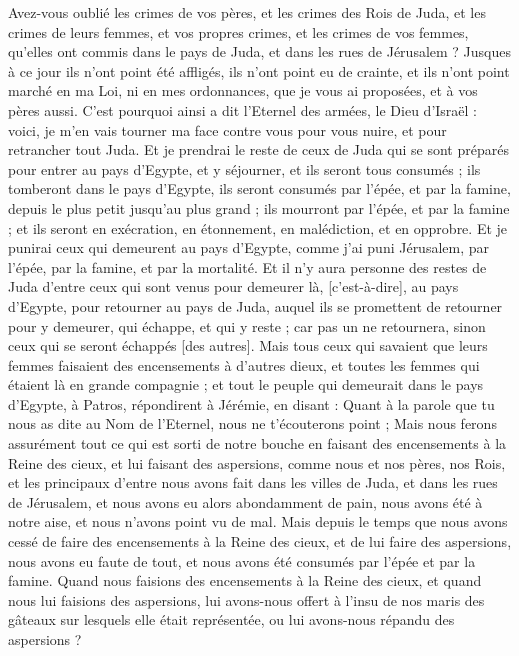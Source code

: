\begin{multicols}{2}
Avez-vous oublié les crimes de vos pères, et les crimes des Rois de Juda, et les crimes de leurs femmes, et vos propres crimes, et les crimes de vos femmes, qu'elles ont commis dans le pays de Juda, et dans les rues de Jérusalem ?
Jusques à ce jour ils n'ont point été affligés, ils n'ont point eu de crainte, et ils n'ont point marché en ma Loi, ni en mes ordonnances, que je vous ai proposées, et à vos pères aussi.
C'est pourquoi ainsi a dit l'Eternel des armées, le Dieu d'Israël : voici, je m'en vais tourner ma face contre vous pour vous nuire, et pour retrancher tout Juda.
Et je prendrai le reste de ceux de Juda qui se sont préparés pour entrer au pays d'Egypte, et y séjourner, et ils seront tous consumés ; ils tomberont dans le pays d'Egypte, ils seront consumés par l'épée, et par la famine, depuis le plus petit jusqu’au plus grand ; ils mourront par l'épée, et par la famine ; et ils seront en exécration, en étonnement, en malédiction, et en opprobre.
Et je punirai ceux qui demeurent au pays d'Egypte, comme j'ai puni Jérusalem, par l'épée, par la famine, et par la mortalité.
Et il n'y aura personne des restes de Juda d'entre ceux qui sont venus pour demeurer là, [c'est-à-dire], au pays d'Egypte, pour retourner au pays de Juda, auquel ils se promettent de retourner pour y demeurer, qui échappe, et qui y reste ; car pas un ne retournera, sinon ceux qui se seront échappés [des autres].
Mais tous ceux qui savaient que leurs femmes faisaient des encensements à d'autres dieux, et toutes les femmes qui étaient là en grande compagnie ; et tout le peuple qui demeurait dans le pays d'Egypte, à Patros, répondirent à Jérémie, en disant :
Quant à la parole que tu nous as dite au Nom de l'Eternel, nous ne t'écouterons point ;
Mais nous ferons assurément tout ce qui est sorti de notre bouche en faisant des encensements à la Reine des cieux, et lui faisant des aspersions, comme nous et nos pères, nos Rois, et les principaux d'entre nous avons fait dans les villes de Juda, et dans les rues de Jérusalem, et nous avons eu alors abondamment de pain, nous avons été à notre aise, et nous n'avons point vu de mal.
Mais depuis le temps que nous avons cessé de faire des encensements à la Reine des cieux, et de lui faire des aspersions, nous avons eu faute de tout, et nous avons été consumés par l'épée et par la famine.
Quand nous faisions des encensements à la Reine des cieux, et quand nous lui faisions des aspersions, lui avons-nous offert à l'insu de nos maris des gâteaux sur lesquels elle était représentée, ou lui avons-nous répandu des aspersions ?

\end{multicols}
